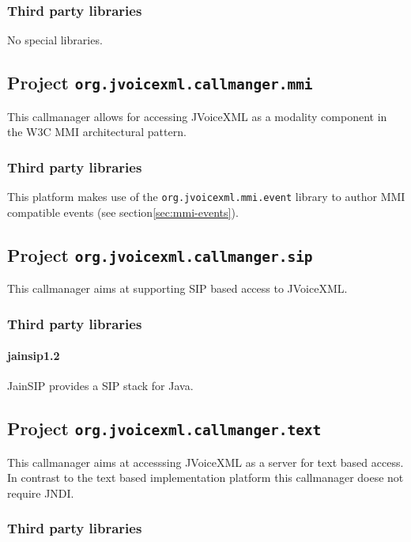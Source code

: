 \documentclass[11pt,a4paper]{article}
\begin{document}
\subsubsection{Third party libraries}
\label{sec:text-third-party-libr}

No special libraries.

\subsection{Project \texttt{org.jvoicexml.callmanger.mmi}}

This callmanager allows for accessing JVoiceXML as a modality component in
the W3C MMI architectural pattern.

\subsubsection{Third party libraries}

This platform makes use of the \lstinline{org.jvoicexml.mmi.event} library
to author MMI compatible events (see section\ref{sec:mmi-events}).

\subsection{Project \texttt{org.jvoicexml.callmanger.sip}}

This callmanager aims at supporting SIP based access to JVoiceXML.

\subsubsection{Third party libraries}

\paragraph{jainsip1.2}

JainSIP provides a SIP stack for Java.

\subsection{Project \texttt{org.jvoicexml.callmanger.text}}

This callmanager aims at accesssing JVoiceXML as a server for text based
access. In contrast to the text based implementation platform this callmanager
doese not require JNDI.

\subsubsection{Third party libraries}
\end{document}
